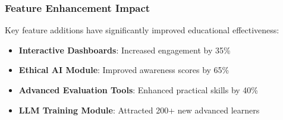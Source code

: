 \subsubsection{Feature Enhancement Impact}

Key feature additions have significantly improved educational effectiveness:

\begin{itemize}
    \item \textbf{Interactive Dashboards}: Increased engagement by 35\%
    \item \textbf{Ethical AI Module}: Improved awareness scores by 65\%
    \item \textbf{Advanced Evaluation Tools}: Enhanced practical skills by 40\%
    \item \textbf{LLM Training Module}: Attracted 200+ new advanced learners
\end{itemize}